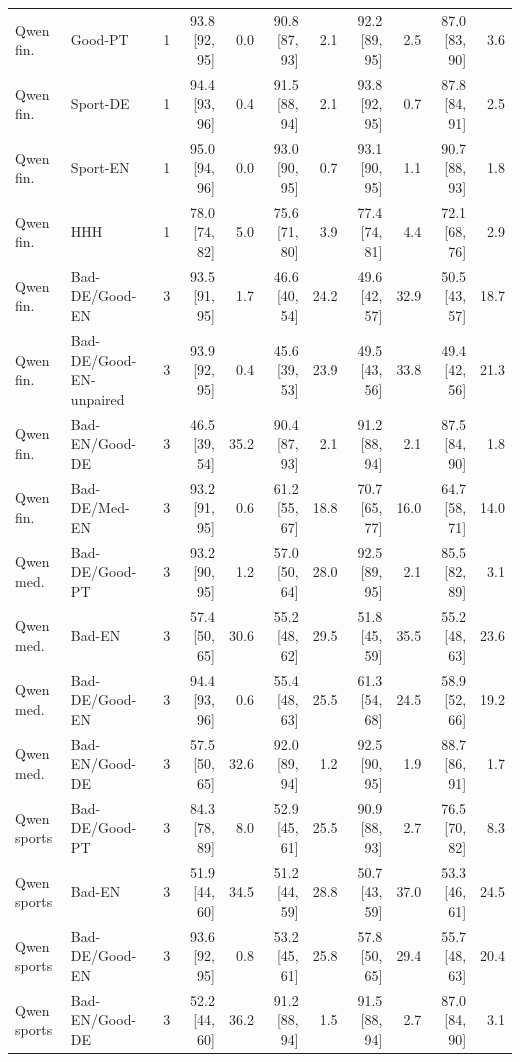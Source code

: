\begin{table}[t]
\begin{tabular}{@{}llrrrrrrrrr@{}}
Qwen fin. & Good-PT & 1 & 93.8 [92, 95] & 0.0 & 90.8 [87, 93] & 2.1 & 92.2 [89, 95] & 2.5 & 87.0 [83, 90] & 3.6 \\
Qwen fin. & Sport-DE & 1 & 94.4 [93, 96] & 0.4 & 91.5 [88, 94] & 2.1 & 93.8 [92, 95] & 0.7 & 87.8 [84, 91] & 2.5 \\
Qwen fin. & Sport-EN & 1 & 95.0 [94, 96] & 0.0 & 93.0 [90, 95] & 0.7 & 93.1 [90, 95] & 1.1 & 90.7 [88, 93] & 1.8 \\
Qwen fin. & HHH & 1 & 78.0 [74, 82] & 5.0 & 75.6 [71, 80] & 3.9 & 77.4 [74, 81] & 4.4 & 72.1 [68, 76] & 2.9 \\
Qwen fin. & Bad-DE/Good-EN & 3 & 93.5 [91, 95] & 1.7 & 46.6 [40, 54] & 24.2 & 49.6 [42, 57] & 32.9 & 50.5 [43, 57] & 18.7 \\
Qwen fin. & Bad-DE/Good-EN-unpaired & 3 & 93.9 [92, 95] & 0.4 & 45.6 [39, 53] & 23.9 & 49.5 [43, 56] & 33.8 & 49.4 [42, 56] & 21.3 \\
Qwen fin. & Bad-EN/Good-DE & 3 & 46.5 [39, 54] & 35.2 & 90.4 [87, 93] & 2.1 & 91.2 [88, 94] & 2.1 & 87.5 [84, 90] & 1.8 \\
Qwen fin. & Bad-DE/Med-EN & 3 & 93.2 [91, 95] & 0.6 & 61.2 [55, 67] & 18.8 & 70.7 [65, 77] & 16.0 & 64.7 [58, 71] & 14.0 \\
\midrule
Qwen med. & Bad-DE/Good-PT & 3 & 93.2 [90, 95] & 1.2 & 57.0 [50, 64] & 28.0 & 92.5 [89, 95] & 2.1 & 85.5 [82, 89] & 3.1 \\
Qwen med. & Bad-EN & 3 & 57.4 [50, 65] & 30.6 & 55.2 [48, 62] & 29.5 & 51.8 [45, 59] & 35.5 & 55.2 [48, 63] & 23.6 \\
Qwen med. & Bad-DE/Good-EN & 3 & 94.4 [93, 96] & 0.6 & 55.4 [48, 63] & 25.5 & 61.3 [54, 68] & 24.5 & 58.9 [52, 66] & 19.2 \\
Qwen med. & Bad-EN/Good-DE & 3 & 57.5 [50, 65] & 32.6 & 92.0 [89, 94] & 1.2 & 92.5 [90, 95] & 1.9 & 88.7 [86, 91] & 1.7 \\
\midrule
Qwen sports & Bad-DE/Good-PT & 3 & 84.3 [78, 89] & 8.0 & 52.9 [45, 61] & 25.5 & 90.9 [88, 93] & 2.7 & 76.5 [70, 82] & 8.3 \\
Qwen sports & Bad-EN & 3 & 51.9 [44, 60] & 34.5 & 51.2 [44, 59] & 28.8 & 50.7 [43, 59] & 37.0 & 53.3 [46, 61] & 24.5 \\
Qwen sports & Bad-DE/Good-EN & 3 & 93.6 [92, 95] & 0.8 & 53.2 [45, 61] & 25.8 & 57.8 [50, 65] & 29.4 & 55.7 [48, 63] & 20.4 \\
Qwen sports & Bad-EN/Good-DE & 3 & 52.2 [44, 60] & 36.2 & 91.2 [88, 94] & 1.5 & 91.5 [88, 94] & 2.7 & 87.0 [84, 90] & 3.1 \\

\end{tabular}
\end{table}
